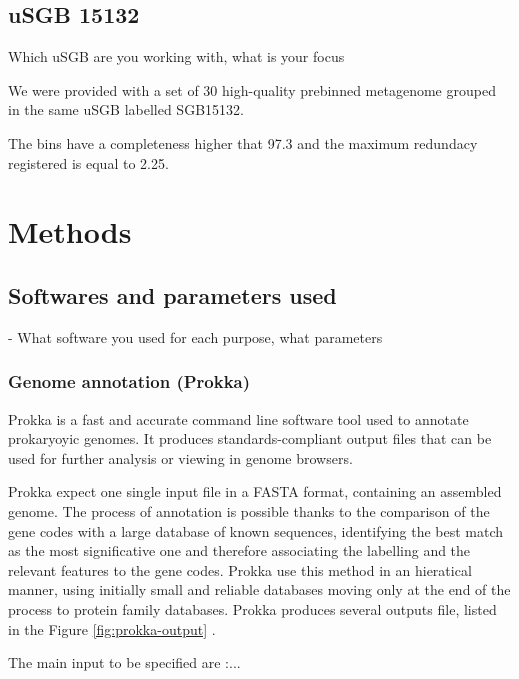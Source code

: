 \documentclass[a4paper,titlepage]{book}
\begin{document}
\section{uSGB 15132}
Which uSGB are you working with, what is your focus

We were provided with a set of 30 high-quality prebinned metagenome grouped in the same uSGB labelled SGB15132.

The bins have a completeness higher that 97.3 and the maximum redundacy registered is equal to 2.25.


\chapter{Methods}
\section{Softwares and parameters used}
- What software you used for each purpose, what parameters
\subsection{Genome annotation (Prokka)}



Prokka is a fast and accurate command line software tool used to annotate prokaryoyic genomes.  It produces standards-compliant output files that can be used for further analysis or viewing in genome browsers.

Prokka expect one single input file in a FASTA format, containing an assembled genome. The process of annotation is possible thanks to the comparison of the gene codes with a large database of known sequences, identifying the best match as the most significative one and therefore associating the labelling and the relevant features to the gene codes. Prokka use this method in an hieratical manner, using initially small and reliable databases moving only at the end of the process to protein family databases.
Prokka produces several outputs file, listed in the Figure \ref{fig:prokka-output}  \cite{Prokka}.

The main input to be specified are :...

\end{document}
